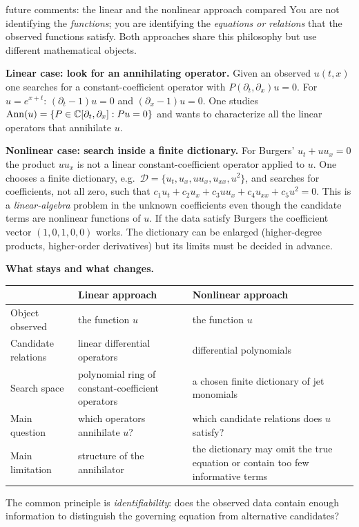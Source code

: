 \begin{explained}{future comments: the linear and the nonlinear approach compared}
You are not identifying the \emph{functions}; you are identifying the \emph{equations or relations} that the observed functions satisfy. Both approaches share this philosophy but use different mathematical objects.

\medskip\textbf{Linear case: look for an annihilating operator.} Given an observed $u(t,x)$ one searches for a constant-coefficient operator with $P(\partial_t,\partial_x)u=0$. For $u=e^{x+t}$: $(\partial_t-1)u=0$ and $(\partial_x-1)u=0$. One studies $\operatorname{Ann}(u)=\{P\in\mathbb{C}[\partial_t,\partial_x]:Pu=0\}$ and wants to characterize all the linear operators that annihilate $u$.

\medskip\textbf{Nonlinear case: search inside a finite dictionary.} For Burgers' $u_t+uu_x=0$ the product $uu_x$ is not a linear constant-coefficient operator applied to $u$. One chooses a finite dictionary, e.g.\ $\mathcal D=\{u_t,u_x,uu_x,u_{xx},u^2\}$, and searches for coefficients, not all zero, such that $c_1u_t+c_2u_x+c_3uu_x+c_4u_{xx}+c_5u^2=0$. This is a \emph{linear-algebra} problem in the unknown coefficients even though the candidate terms are nonlinear functions of $u$. If the data satisfy Burgers the coefficient vector $(1,0,1,0,0)$ works. The dictionary can be enlarged (higher-degree products, higher-order derivatives) but its limits must be decided in advance.

\medskip\textbf{What stays and what changes.}
\begin{center}\small
\begin{tabular}{@{}L{2.9cm}L{5.6cm}L{5.8cm}@{}}
\toprule
 & Linear approach & Nonlinear approach\\\midrule
Object observed & the function $u$ & the function $u$\\
Candidate relations & linear differential operators & differential polynomials\\
Search space & polynomial ring of constant-coefficient operators & a chosen finite dictionary of jet monomials\\
Main question & which operators annihilate $u$? & which candidate relations does $u$ satisfy?\\
Main limitation & structure of the annihilator & the dictionary may omit the true equation or contain too few informative terms\\
\bottomrule
\end{tabular}
\end{center}
The common principle is \emph{identifiability}: does the observed data contain enough information to distinguish the governing equation from alternative candidates?


\end{explained}
